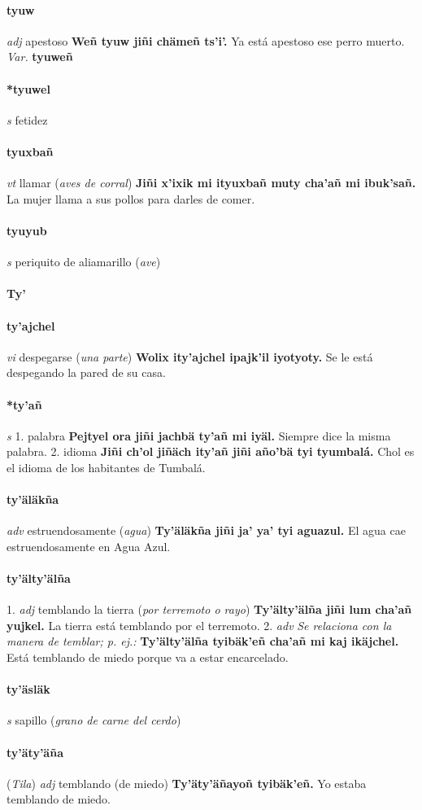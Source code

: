 \documentclass{scrbook}
\newcommand{\entry}[1]{\paragraph{#1}}
\newcommand{\alphaletter}[1]{\addsec{#1}}
\newcommand{\onedefinition}[1]{#1.}
\newcommand{\nontranslationdef}[1]{\textit{#1}}
\newcommand{\partofspeech}[1]{\textit{#1}}
\newcommand{\spanishtranslation}[1]{#1}
\newcommand{\clarification}[1]{(\textit{#1})}
\newcommand{\cholexample}[1]{\textbf{#1}}
\newcommand{\exampletranslation}[1]{#1}
\newcommand{\relevantdialect}[1]{(\textit{#1})}
\newcommand{\variation}[1]{\textit{Var.} \textbf{#1}}
\begin{document}
\begin{multicols}{2}
\entry{tyuw}
\partofspeech{adj}
\spanishtranslation{apestoso}
\cholexample{Weñ tyuw jiñi chämeñ ts'i'.}
\exampletranslation{Ya está apestoso ese perro muerto.}
\variation{tyuweñ}

\entry{*tyuwel}
\partofspeech{s}
\spanishtranslation{fetidez}

\entry{tyuxbañ}
\partofspeech{vt}
\spanishtranslation{llamar}
\clarification{aves de corral}
\cholexample{Jiñi x'ixik mi ityuxbañ muty cha'añ mi ibuk'sañ.}
\exampletranslation{La mujer llama a sus pollos para darles de comer.}

\entry{tyuyub}
\partofspeech{s}
\spanishtranslation{periquito de aliamarillo}
\clarification{ave}

\entry{Ty'}
\alphaletter{Ty'}

\entry{ty'ajchel}
\partofspeech{vi}
\spanishtranslation{despegarse}
\clarification{una parte}
\cholexample{Wolix ity'ajchel ipajk'il iyotyoty.}
\exampletranslation{Se le está despegando la pared de su casa.}

\entry{*ty'añ}
\partofspeech{s}
\onedefinition{1}
\spanishtranslation{palabra}
\cholexample{Pejtyel ora jiñi jachbä ty'añ mi iyäl.}
\exampletranslation{Siempre dice la misma palabra.}
\onedefinition{2}
\spanishtranslation{idioma}
\cholexample{Jiñi ch'ol jiñäch ity'añ jiñi año'bä tyi tyumbalá.}
\exampletranslation{Chol es el idioma de los habitantes de Tumbalá.}

\entry{ty'äläkña}
\partofspeech{adv}
\spanishtranslation{estruendosamente}
\clarification{agua}
\cholexample{Ty'äläkña jiñi ja' ya' tyi aguazul.}
\exampletranslation{El agua cae estruendosamente en Agua Azul.}

\entry{ty'älty'älña}
\onedefinition{1}
\partofspeech{adj}
\spanishtranslation{temblando la tierra}
\clarification{por terremoto o rayo}
\cholexample{Ty'älty'älña jiñi lum cha'añ yujkel.}
\exampletranslation{La tierra está temblando por el terremoto.}
\onedefinition{2}
\partofspeech{adv}
\nontranslationdef{Se relaciona con la manera de temblar; p. ej.:}
\cholexample{Ty'älty'älña tyibäk'eñ cha'añ mi kaj ikäjchel.}
\exampletranslation{Está temblando de miedo porque va a estar encarcelado.}

\entry{ty'äsläk}
\partofspeech{s}
\spanishtranslation{sapillo}
\clarification{grano de carne del cerdo}

\entry{ty'äty'äña}
\relevantdialect{Tila}
\partofspeech{adj}
\spanishtranslation{temblando (de miedo)}
\cholexample{Ty'äty'äñayoñ tyibäk'eñ.}
\exampletranslation{Yo estaba temblando de miedo.}


\end{multicols}
\end{document}
